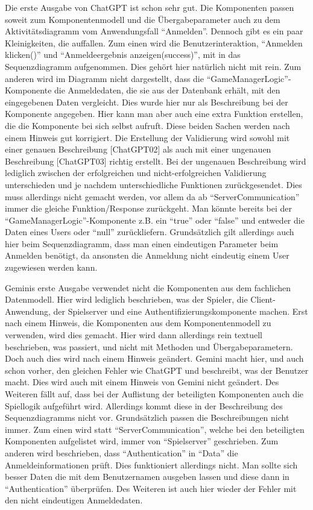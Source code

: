 Die erste Ausgabe von ChatGPT ist schon sehr gut. Die Komponenten passen soweit zum Komponentenmodell und die Übergabeparameter auch 
zu dem Aktivitätsdiagramm vom Anwendungsfall ``Anmelden''. Dennoch gibt es ein paar Kleinigkeiten, die auffallen. Zum einen wird die 
Benutzerinteraktion, ``Anmelden klicken()'' und ``Anmeldeergebnis anzeigen(success)'', mit in das Sequenzdiagramm aufgenommen. Dies gehört 
hier natürlich nicht mit rein. Zum anderen wird im Diagramm nicht dargestellt, dass die ``GameManagerLogic''-Komponente die 
Anmeldedaten, die sie aus der Datenbank erhält, mit den eingegebenen Daten vergleicht. Dies wurde hier nur als Beschreibung bei der 
Komponente angegeben. Hier kann man aber auch eine extra Funktion erstellen, die die Komponente bei sich selbst aufruft. Diese beiden 
Sachen werden nach einem Hinweis gut korrigiert. Die Erstellung der Validierung wird sowohl mit einer genauen Beschreibung [ChatGPT02] 
als auch mit einer ungenauen Beschreibung [ChatGPT03] richtig erstellt. Bei der ungenauen Beschreibung wird lediglich zwischen der 
erfolgreichen und nicht-erfolgreichen Validierung unterschieden und je nachdem unterschiedliche Funktionen zurückgesendet. Dies muss 
allerdings nicht gemacht werden, vor allem da ab ``ServerCommunication'' immer die gleiche Funktion/Response zurückgeht. Man könnte 
bereits bei der ``GameManagerLogic''-Komponente z.B. ein ``true'' oder ``false'' und entweder die Daten eines Users oder ``null'' 
zurückliefern. Grundsätzlich gilt allerdings auch hier beim Sequenzdiagramm, dass man einen eindeutigen Parameter beim Anmelden 
benötigt, da ansonsten die Anmeldung nicht eindeutig einem User zugewiesen werden kann.

Geminis erste Ausgabe verwendet nicht die Komponenten aus dem fachlichen Datenmodell. Hier wird lediglich beschrieben, was der 
Spieler, die Client-Anwendung, der Spielserver und eine Authentifizierungskomponente machen. Erst nach einem Hinweis, die Komponenten 
aus dem Komponentenmodell zu verwenden, wird dies gemacht. Hier wird dann allerdings rein textuell beschrieben, was passiert, und 
nicht mit Methoden und Übergabeparametern. Doch auch dies wird nach einem Hinweis geändert. Gemini macht hier, und auch schon vorher, 
den gleichen Fehler wie ChatGPT und beschreibt, was der Benutzer macht. Dies wird auch mit einem Hinweis von Gemini nicht geändert. 
Des Weiteren fällt auf, dass bei der Auflistung der beteiligten Komponenten auch die Spiellogik aufgeführt wird. Allerdings kommt 
diese in der Beschreibung des Sequenzdiagramms nicht vor. Grundsätzlich passen die Beschreibungen nicht immer. Zum einen wird statt 
``ServerCommunication'', welche bei den beteiligten Komponenten aufgelistet wird, immer von ``Spielserver'' geschrieben. Zum anderen wird 
beschrieben, dass ``Authentication'' in ``Data'' die Anmeldeinformationen prüft. Dies funktioniert allerdings nicht. Man sollte sich 
besser Daten die mit dem Benutzernamen ausgeben lassen und diese dann in ``Authentication'' überprüfen. Des Weiteren ist auch hier 
wieder der Fehler mit den nicht eindeutigen Anmeldedaten.

